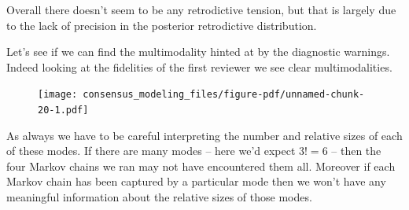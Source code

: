 \documentclass[
  letterpaper,
  DIV=11,
  numbers=noendperiod]{scrartcl}
\newenvironment{Shaded}{\begin{snugshade}}{\end{snugshade}}
\newcommand{\AttributeTok}[1]{\textcolor[rgb]{0.40,0.45,0.13}{#1}}
\newcommand{\ControlFlowTok}[1]{\textcolor[rgb]{0.00,0.23,0.31}{#1}}
\newcommand{\DecValTok}[1]{\textcolor[rgb]{0.68,0.00,0.00}{#1}}
\newcommand{\FunctionTok}[1]{\textcolor[rgb]{0.28,0.35,0.67}{#1}}
\newcommand{\NormalTok}[1]{\textcolor[rgb]{0.00,0.23,0.31}{#1}}
\newcommand{\OtherTok}[1]{\textcolor[rgb]{0.00,0.23,0.31}{#1}}
\newcommand{\SpecialCharTok}[1]{\textcolor[rgb]{0.37,0.37,0.37}{#1}}
\newcommand{\StringTok}[1]{\textcolor[rgb]{0.13,0.47,0.30}{#1}}
\begin{document}
Overall there doesn't seem to be any retrodictive tension, but that is
largely due to the lack of precision in the posterior retrodictive
distribution.

Let's see if we can find the multimodality hinted at by the diagnostic
warnings. Indeed looking at the fidelities of the first reviewer we see
clear multimodalities.

\begin{Shaded}
\end{Shaded}

\begin{figure}[H]

{\centering \texttt{[image: consensus\_modeling\_files/figure-pdf/unnamed-chunk-20-1.pdf]}

}

\end{figure}

As always we have to be careful interpreting the number and relative
sizes of each of these modes. If there are many modes -- here we'd
expect \(3! = 6\) -- then the four Markov chains we ran may not have
encountered them all. Moreover if each Markov chain has been captured by
a particular mode then we won't have any meaningful information about
the relative sizes of those modes.
\end{document}
